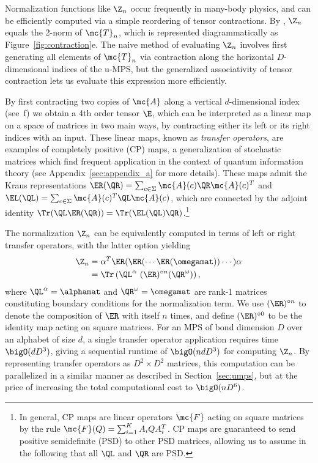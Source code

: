Normalization functions like $\Z_n$ occur frequently in many-body physics, and can be efficiently computed via a simple reordering of tensor contractions. By , $\Z_n$ equals the 2-norm of $\mc{T}_n$, which is represented diagrammatically as Figure~\ref{fig:contraction}e. The naive method of evaluating $\Z_n$ involves first generating all elements of $\mc{T}_n$ via contraction along the horizontal $D$-dimensional indices of the u-MPS, but the generalized associativity of tensor contraction lets us evaluate this expression more efficiently.

By first contracting two copies of $\mc{A}$ along a vertical $d$-dimensional index (see~f) we obtain a 4th order tensor $\E$, which can be interpreted as a linear map on a space of matrices in two main ways, by contracting either its left or its right indices with an input. These linear maps, known as \emph{transfer operators}, are examples of completely positive (CP) maps, a generalization of stochastic matrices which find frequent application in the context of quantum information theory (see Appendix~\ref{sec:appendix_a} for more details). These maps admit the Kraus representations $\ER(\QR) = \sum_{c\in\Sigma} \mc{A}(c) \QR \mc{A}(c)^T$ and $\EL(\QL) = \sum_{c\in\Sigma} \mc{A}(c)^T \QL \mc{A}(c)$, which are connected by the adjoint identity $\Tr(\QL \ER(\QR)) = \Tr(\EL(\QL) \QR)$.\footnote{In general, CP maps are linear operators $\mc{F}$ acting on square matrices by the rule $\mc{F}(Q) = \sum_{i=1}^K A_i Q A_i^T$. CP maps are guaranteed to send positive semidefinite (PSD) to other PSD matrices, allowing us to assume in the following that all $\QL$ and $\QR$ are PSD.}

The normalization $\Z_n$ can be equivalently computed in terms of left or right transfer operators, with the latter option yielding
%
\begin{align}
\label{eq:normalization}
\Z_n &= \alpha^T \ER(\ER(\cdots\ER(\omegamat))\cdots) \alpha \nonumber\\
         &= \Tr\left( \QL^\alpha\ (\ER)^{\circ n}(\QR^\omega) \right),
\end{align}
%
where $\QL^\alpha = \alphamat$ and $\QR^\omega = \omegamat$ are rank-1 matrices constituting boundary conditions for the normalization term. We use $(\ER)^{\circ n}$ to denote the composition of $\ER$ with itself $n$ times, and define $(\ER)^{\circ 0}$ to be the identity map acting on square matrices. For an MPS of bond dimension $D$ over an alphabet of size $d$, a single transfer operator application requires time $\bigO(dD^3)$, giving a sequential runtime of $\bigO(ndD^3)$ for computing $\Z_n$. By representing transfer operators as $D^2 \times D^2$ matrices, this computation can be parallelized in a similar manner as described in Section~\ref{sec:umps}, but at the price of increasing the total computational cost to $\bigO(nD^6)$.

